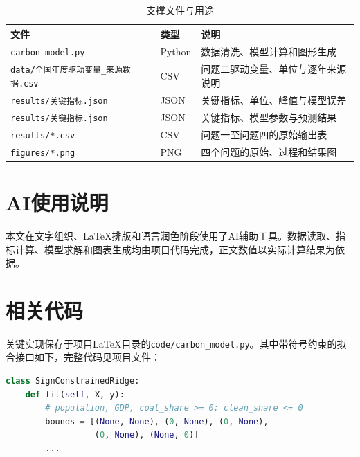 \documentclass[12pt,a4paper]{ctexart}
\theoremstyle{definition}
\theoremstyle{plain}
\theoremstyle{remark}
\begin{document}
\begin{table}[H]
\centering
\caption{支撑文件与用途}
\label{tab:support}
\begin{tabular}{>{\raggedright\arraybackslash}p{4.3cm}>{\centering\arraybackslash}p{1.2cm}>{\raggedright\arraybackslash}p{5.3cm}}
\toprule
文件 & 类型 & 说明\\
\midrule
\texttt{carbon\_model.py} & Python & 数据清洗、模型计算和图形生成\\
\texttt{data/全国年度驱动变量\_来源数据.csv} & CSV & 问题二驱动变量、单位与逐年来源说明\\
\texttt{results/关键指标.json} & JSON & 关键指标、单位、峰值与模型误差\\
\texttt{results/关键指标.json} & JSON & 关键指标、模型参数与预测结果\\
\texttt{results/*.csv} & CSV & 问题一至问题四的原始输出表\\
\texttt{figures/*.png} & PNG & 四个问题的原始、过程和结果图\\
\bottomrule
\end{tabular}
\end{table}


\section{AI使用说明}
本文在文字组织、LaTeX排版和语言润色阶段使用了AI辅助工具。数据读取、指标计算、模型求解和图表生成均由项目代码完成，正文数值以实际计算结果为依据。

\section{相关代码}
关键实现保存于项目LaTeX目录的\texttt{code/carbon\_model.py}。其中带符号约束的拟合接口如下，完整代码见项目文件：
\begin{lstlisting}[language=Python, caption={带符号约束岭回归接口}, label={lst:ridge}]
class SignConstrainedRidge:
    def fit(self, X, y):
        # population, GDP, coal_share >= 0; clean_share <= 0
        bounds = [(None, None), (0, None), (0, None),
                  (0, None), (None, 0)]
        ...
\end{lstlisting}
\end{document}
